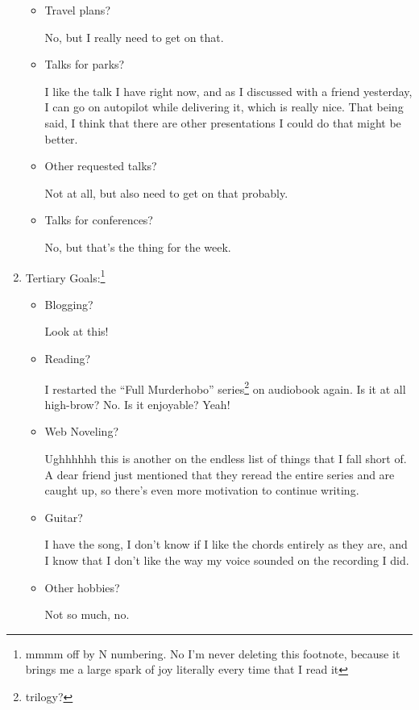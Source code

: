 \documentclass[12pt]{article}
\newcommand{\say}[1]{``#1''}
\renewcommand{\,}{\textsuperscript{,}}
\begin{document}
\begin{enumerate}
\begin{itemize}
\item Travel plans?

No, but I really need to get on that.

\item Talks for parks?

I like the talk I have right now, and as I discussed with a friend yesterday, I can go on autopilot while delivering it, which is really nice.  
That being said, I think that there are other presentations I could do that might be better.

\item Other requested talks?

Not at all, but also need to get on that probably.

\item Talks for conferences?

No, but that's the thing for the week.

\end{itemize}

\item Tertiary Goals:\footnote{mmmm off by N numbering. No I'm never deleting this footnote, because it brings me a large spark of joy literally every time that I read it}

\begin{itemize}

\item Blogging?

Look at this!

\item Reading?

I restarted the \say{Full Murderhobo} series\footnote{trilogy?} on audiobook again.  
Is it at all high-brow? No.  
Is it enjoyable? Yeah!

\item Web Noveling?

Ughhhhhh this is another on the endless list of things that I fall short of.  
A dear friend just mentioned that they reread the entire series and are caught up, so there's even more motivation to continue writing.

\item Guitar?

I have the song, I don't know if I like the chords entirely as they are, and I know that I don't like the way my voice sounded on the recording I did.

\item Other hobbies?

Not so much, no.


\end{itemize}
\end{enumerate}
\end{document}
